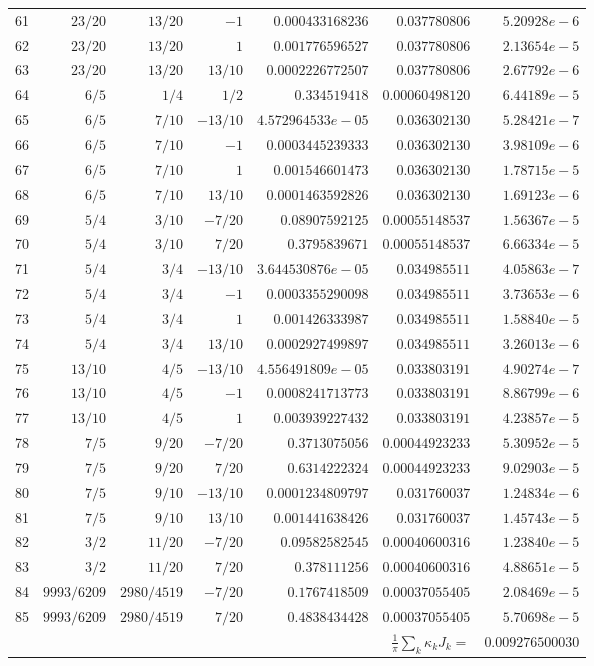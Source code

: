 \documentclass[11pt,reqno]{amsart}
\numberwithin{equation}{section}
\theoremstyle{definition}
\theoremstyle{remark}
\begin{document}
\begin{center}
\begin{longtable}{@{}rrrrrrr@{}}
61 & $23/20$ & $13/20$ & $-1$ & $0.000433168236$ & $0.037780806$ & $5.20928e-6$\\
62 & $23/20$ & $13/20$ & $1$ & $0.001776596527$ & $0.037780806$ & $2.13654e-5$\\
63 & $23/20$ & $13/20$ & $13/10$ & $0.0002226772507$ & $0.037780806$ & $2.67792e-6$\\
64 & $6/5$ & $1/4$ & $1/2$ & $0.334519418$ & $0.00060498120$ & $6.44189e-5$\\
65 & $6/5$ & $7/10$ & $-13/10$ & $4.572964533e-05$ & $0.036302130$ & $5.28421e-7$\\
66 & $6/5$ & $7/10$ & $-1$ & $0.0003445239333$ & $0.036302130$ & $3.98109e-6$\\
67 & $6/5$ & $7/10$ & $1$ & $0.001546601473$ & $0.036302130$ & $1.78715e-5$\\
68 & $6/5$ & $7/10$ & $13/10$ & $0.0001463592826$ & $0.036302130$ & $1.69123e-6$\\
69 & $5/4$ & $3/10$ & $-7/20$ & $0.08907592125$ & $0.00055148537$ & $1.56367e-5$\\
70 & $5/4$ & $3/10$ & $7/20$ & $0.3795839671$ & $0.00055148537$ & $6.66334e-5$\\
71 & $5/4$ & $3/4$ & $-13/10$ & $3.644530876e-05$ & $0.034985511$ & $4.05863e-7$\\
72 & $5/4$ & $3/4$ & $-1$ & $0.0003355290098$ & $0.034985511$ & $3.73653e-6$\\
73 & $5/4$ & $3/4$ & $1$ & $0.001426333987$ & $0.034985511$ & $1.58840e-5$\\
74 & $5/4$ & $3/4$ & $13/10$ & $0.0002927499897$ & $0.034985511$ & $3.26013e-6$\\
75 & $13/10$ & $4/5$ & $-13/10$ & $4.556491809e-05$ & $0.033803191$ & $4.90274e-7$\\
76 & $13/10$ & $4/5$ & $-1$ & $0.0008241713773$ & $0.033803191$ & $8.86799e-6$\\
77 & $13/10$ & $4/5$ & $1$ & $0.003939227432$ & $0.033803191$ & $4.23857e-5$\\
78 & $7/5$ & $9/20$ & $-7/20$ & $0.3713075056$ & $0.00044923233$ & $5.30952e-5$\\
79 & $7/5$ & $9/20$ & $7/20$ & $0.6314222324$ & $0.00044923233$ & $9.02903e-5$\\
80 & $7/5$ & $9/10$ & $-13/10$ & $0.0001234809797$ & $0.031760037$ & $1.24834e-6$\\
81 & $7/5$ & $9/10$ & $13/10$ & $0.001441638426$ & $0.031760037$ & $1.45743e-5$\\
82 & $3/2$ & $11/20$ & $-7/20$ & $0.09582582545$ & $0.00040600316$ & $1.23840e-5$\\
83 & $3/2$ & $11/20$ & $7/20$ & $0.378111256$ & $0.00040600316$ & $4.88651e-5$\\
84 & $9993/6209$ & $2980/4519$ & $-7/20$ & $0.1767418509$ & $0.00037055405$ & $2.08469e-5$\\
85 & $9993/6209$ & $2980/4519$ & $7/20$ & $0.4838434428$ & $0.00037055405$ & $5.70698e-5$\\
\midrule \multicolumn{6}{r}{$\frac1\pi\sum_k\kappa_kJ_k=$} & $0.009276500030$\\
\end{longtable}
\end{center}
\end{document}
